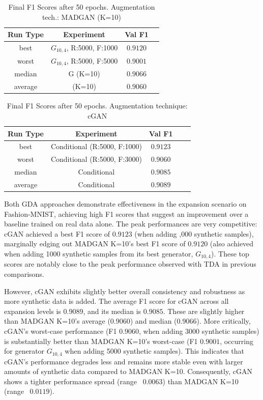 \begin{table}[H]
	\vspace{-1.5em}
	\centering
	\begin{tabular}{|c|c|c|c|}
		\hline
		Run Type & Experiment & Val F1 \\ \hline
		best & \(G_{10, 4}\), R:5000, F:1000 & $0.9120$\\ \hline
		worst & \(G_{10, 4}\), R:5000, F:5000 & $0.9001$\\ \hline
		median & G (K=10) & $0.9066$\\ \hline
		average & (K=10) & $0.9060$
		\\ \hline
	\end{tabular}
    \caption{Final F1 Scores after 50 epochs. Augmentation tech.: MADGAN (K=10)}
        \label{tab:res_expansion_fashion_cgan_vs_madgan__madgan}
\end{table}
\begin{table}[H]
	\centering
	\vspace{-1.5em}
	\begin{tabular}{|c|c|c|c|c|}
		\hline
		Run Type & Experiment & Val F1 \\ \hline
		best & Conditional (R:5000, F:1000) & $0.9123$\\ \hline
		worst & Conditional (R:5000, F:3000) & $0.9060$\\ \hline
		median & Conditional & $0.9085$\\ \hline
		average & Conditional & $0.9089$
		\\ \hline
	\end{tabular}
    \caption{Final F1 Scores after 50 epochs. Augmentation technique: cGAN}
        \label{tab:res_expansion_fashion_cgan_vs_madgan__cgan}
\end{table}

Both GDA approaches demonstrate effectiveness in the expansion scenario on Fashion-MNIST, achieving high F1 scores that suggest an improvement over a baseline trained on real data alone. The peak performances are very competitive: cGAN achieved a best F1 score of $0.9123$ (when adding ,000 synthetic samples), marginally edging out MADGAN K=10's best F1 score of $0.9120$ (also achieved when adding 1000 synthetic samples from its best generator, \(G_{10,4}\)). These top scores are notably close to the peak performance observed with TDA in previous comparisons.

However, cGAN exhibits slightly better overall consistency and robustness as more synthetic data is added. The average F1 score for cGAN across all expansion levels is $0.9089$, and its median is $0.9085$. These are slightly higher than MADGAN K=10's average ($0.9060$) and median ($0.9066$). More critically, cGAN's worst-case performance (F1 $0.9060$, when adding 3000 synthetic samples) is substantially better than MADGAN K=10's worst-case (F1 $0.9001$, occurring for generator \(G_{10,4}\) when adding 5000 synthetic samples). This indicates that cGAN's performance degrades less and remains more stable even with larger amounts of synthetic data compared to MADGAN K=10. Consequently, cGAN shows a tighter performance spread (range ~$0.0063$) than MADGAN K=10 (range ~$0.0119$).

